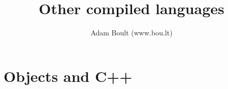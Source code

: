 \documentclass[oneside]{book}
\begin{document}
\author{Adam Boult (www.bou.lt)}
\title{Other compiled languages}
\maketitle

\setcounter{tocdepth}{0}
\tableofcontents




\part{Objects and C++}



\end{document}
